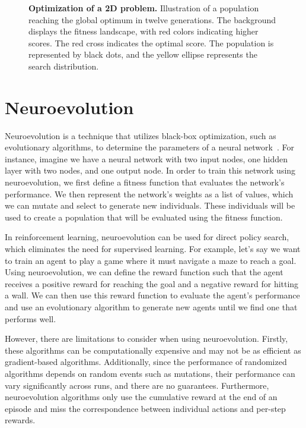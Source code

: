 \begin{figure}[!ht]
\centering
{}
\caption[Optimization of a 2D problem]{
  \textbf{Optimization of a 2D problem.}
  Illustration of a population reaching the global optimum in twelve generations. The background displays the fitness landscape, with red colors indicating higher scores. The red cross indicates the optimal score. The population is represented by black dots, and the yellow ellipse represents the search distribution.
 }
\label{fig:cma_es}
\end{figure}

\section{Neuroevolution}

Neuroevolution is a technique that utilizes black-box optimization, such as evolutionary algorithms, to determine the parameters of a neural network~\cite{cuccu_extending_2018}. For instance, imagine we have a neural network with two input nodes, one hidden layer with two nodes, and one output node. In order to train this network using neuroevolution, we first define a fitness function that evaluates the network's performance. We then represent the network's weights as a list of values, which we can mutate and select to generate new individuals. These individuals will be used to create a population that will be evaluated using the fitness function.

In reinforcement learning, neuroevolution can be used for direct policy search, which eliminates the need for supervised learning. For example, let's say we want to train an agent to play a game where it must navigate a maze to reach a goal. Using neuroevolution, we can define the reward function such that the agent receives a positive reward for reaching the goal and a negative reward for hitting a wall. We can then use this reward function to evaluate the agent's performance and use an evolutionary algorithm to generate new agents until we find one that performs well.

However, there are limitations to consider when using neuroevolution. Firstly, these algorithms can be computationally expensive and may not be as efficient as gradient-based algorithms. Additionally, since the performance of randomized algorithms depends on random events such as mutations, their performance can vary significantly across runs, and there are no guarantees. Furthermore, neuroevolution algorithms only use the cumulative reward at the end of an episode and miss the correspondence between individual actions and per-step rewards.

